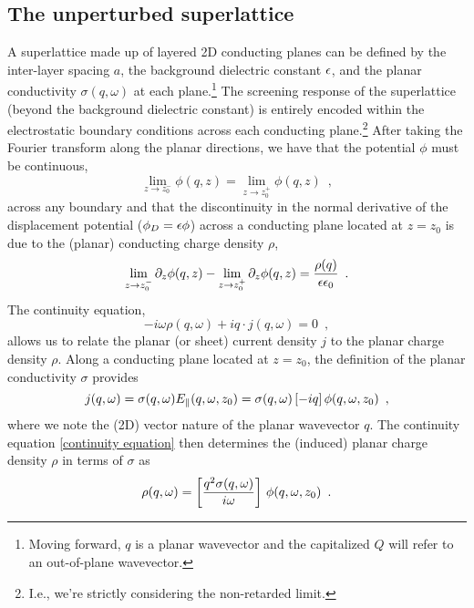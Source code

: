 \subsection{The unperturbed superlattice}

A superlattice made up of layered 2D conducting planes can be defined by the inter-layer spacing $a$, the background dielectric constant $\epsilon$, and the planar conductivity $\sigma(q,\omega)$ at each plane.\footnote{Moving forward, $q$ is a planar wavevector and the capitalized $Q$ will refer to an out-of-plane wavevector.}  The screening response of the superlattice (beyond the background dielectric constant) is entirely encoded within the electrostatic boundary conditions across each conducting plane.\footnote{I.e., we're strictly considering the non-retarded limit.}  After taking the Fourier transform along the planar directions, we have that the potential $\phi$ must be continuous,
\begin{equation}
    \label{phi continuity}
    \lim_{z\to z_0^-}\phi(q,z) = \lim_{z\to z_0^+}\phi(q,z)
    \,\,\,,
\end{equation}
across any boundary and that the discontinuity in the normal derivative of the displacement potential ($\phi_D = \epsilon\phi$) across a conducting plane located at $z=z_0$ is due to the (planar) conducting charge density $\rho$,
\begin{equation}
    \label{phi discontinuity expression}
    \lim_{z\to z_0^-}\partial_z\phi(q,z) - \lim_{z\to z_0^+}\partial_z\phi(q,z) = \frac{\rho(q)}{\epsilon\epsilon_0}
    \,\,\,.
\end{equation}
The continuity equation,
\begin{equation}
\label{continuity equation}
    -i\omega\rho(q,\omega) +iq\cdot j(q,\omega) = 0
    \,\,\,,
\end{equation}
allows us to relate the planar (or sheet) current density $j$ to the planar charge density $\rho$.  Along a conducting plane located at $z=z_0$, the definition of the planar conductivity $\sigma$ provides
\begin{equation}
    \label{conductivity def}
    j(q,\omega) = \sigma(q,\omega) E_\parallel(q,\omega,z_0) = \sigma(q,\omega) \left[ -i q\right]\phi(q,\omega,z_0)
    \,\,\,,
\end{equation}
where we note the (2D) vector nature of the planar wavevector $q$.  The continuity equation \eqref{continuity equation} then determines the (induced) planar charge density $\rho$ in terms of $\sigma$ as
\begin{equation}
\label{charge density conductivity relation}
\rho(q,\omega) =
\left[\frac{q^2\sigma(q,\omega)}{i\omega}\right]\,\phi(q,\omega,z_0)
\,\,\,.
\end{equation}
